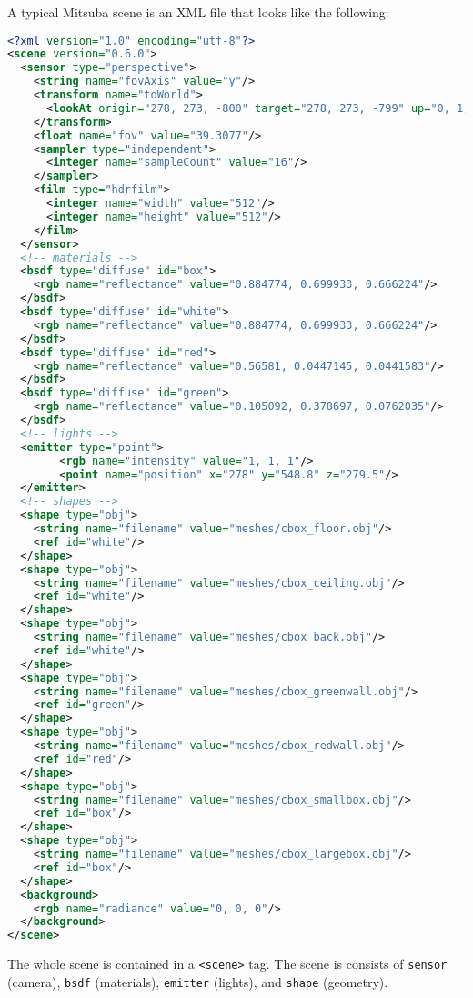 A typical Mitsuba scene is an XML file that looks like the following:
\begin{lstlisting}[language=xml]
<?xml version="1.0" encoding="utf-8"?>
<scene version="0.6.0">
  <sensor type="perspective">
    <string name="fovAxis" value="y"/>
    <transform name="toWorld">
      <lookAt origin="278, 273, -800" target="278, 273, -799" up="0, 1, 0"/>
    </transform>
    <float name="fov" value="39.3077"/>
    <sampler type="independent">
      <integer name="sampleCount" value="16"/>
    </sampler>
    <film type="hdrfilm">
      <integer name="width" value="512"/>
      <integer name="height" value="512"/>
    </film>
  </sensor>
  <!-- materials -->
  <bsdf type="diffuse" id="box">
    <rgb name="reflectance" value="0.884774, 0.699933, 0.666224"/>
  </bsdf>
  <bsdf type="diffuse" id="white">
    <rgb name="reflectance" value="0.884774, 0.699933, 0.666224"/>
  </bsdf>
  <bsdf type="diffuse" id="red">
    <rgb name="reflectance" value="0.56581, 0.0447145, 0.0441583"/>
  </bsdf>
  <bsdf type="diffuse" id="green">
    <rgb name="reflectance" value="0.105092, 0.378697, 0.0762035"/>
  </bsdf>
  <!-- lights -->
  <emitter type="point">
        <rgb name="intensity" value="1, 1, 1"/>
        <point name="position" x="278" y="548.8" z="279.5"/>
  </emitter>
  <!-- shapes -->
  <shape type="obj">
    <string name="filename" value="meshes/cbox_floor.obj"/>
    <ref id="white"/>
  </shape>
  <shape type="obj">
    <string name="filename" value="meshes/cbox_ceiling.obj"/>
    <ref id="white"/>
  </shape>
  <shape type="obj">
    <string name="filename" value="meshes/cbox_back.obj"/>
    <ref id="white"/>
  </shape>
  <shape type="obj">
    <string name="filename" value="meshes/cbox_greenwall.obj"/>
    <ref id="green"/>
  </shape>
  <shape type="obj">
    <string name="filename" value="meshes/cbox_redwall.obj"/>
    <ref id="red"/>
  </shape>
  <shape type="obj">
    <string name="filename" value="meshes/cbox_smallbox.obj"/>
    <ref id="box"/>
  </shape>
  <shape type="obj">
    <string name="filename" value="meshes/cbox_largebox.obj"/>
    <ref id="box"/>
  </shape>
  <background>
    <rgb name="radiance" value="0, 0, 0"/>
  </background>
</scene>
\end{lstlisting}

The whole scene is contained in a \lstinline{<scene>} tag. 
The scene is consists of \lstinline{sensor} (camera), \lstinline{bsdf} (materials), \lstinline{emitter} (lights), and \lstinline{shape} (geometry). 

